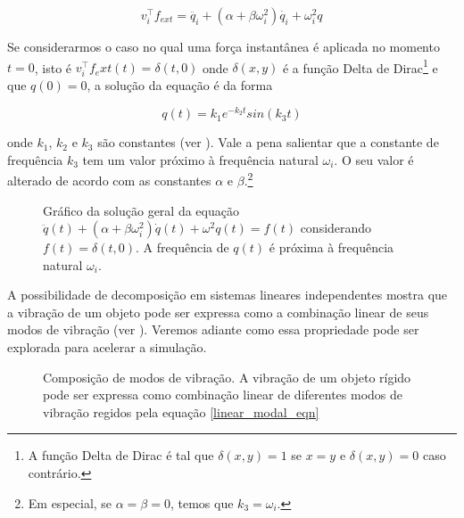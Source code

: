 \begin{equation}
	v_i^\intercal f_{ext} = \ddot{q_i} + (\alpha + \beta\omega_i^2)\dot{q_i} + \omega_i^2q_{}
	\label{linear_modal_eqn}
\end{equation}

Se considerarmos o caso no qual uma força instantânea é aplicada no momento $t = 0$, isto é $v_i^\intercal f_ext(t) = \delta(t, 0)$ onde $\delta(x, y)$ é a função Delta de Dirac\footnote{A função Delta de Dirac é tal que $\delta(x, y) = 1$ se $x = y$ e $\delta(x, y) = 0$ caso contrário.} e que $q(0) = 0$, a solução da equação é da forma

\begin{equation}
	q(t) = k_1 e^{-k_2t} sin(k_3t)
\end{equation}

onde $k_1$, $k_2$ e $k_3$ são constantes (ver ). Vale a pena salientar que a constante de frequência $k_3$ tem um valor próximo à frequência natural $\omega_i$. O seu valor é alterado de acordo com as constantes $\alpha$ e $\beta$.\footnote{Em especial, se $\alpha = \beta = 0$, temos que $k_3 = \omega_i$.}

\begin{figure}[ht]
	\centering
	
	\caption[Gráfico da solução da equação $\ddot{q}(t) + (\alpha + \beta\omega_i^2)\dot{q}(t) + \omega^2q(t) = f(t)$]{Gráfico da solução geral da equação $\ddot{q}(t) + (\alpha + \beta\omega_i^2)\dot{q}(t) + \omega^2q(t) = f(t)$ considerando $f(t) = \delta(t, 0)$. A frequência de $q(t)$ é próxima à frequência natural $\omega_i$.}\label{wave_mode}
\end{figure}

A possibilidade de decomposição em sistemas lineares independentes mostra que a vibração de um objeto pode ser expressa como a combinação linear de seus modos de vibração (ver ). Veremos adiante como essa propriedade pode ser explorada para acelerar a simulação.

\begin{figure}[ht]
	\centering
	
	\caption[Composição de modos de vibração]{Composição de modos de vibração. A vibração de um objeto rígido pode ser expressa como combinação linear de diferentes modos de vibração regidos pela equação \eqref{linear_modal_eqn}}\label{plate_modes}
\end{figure}



